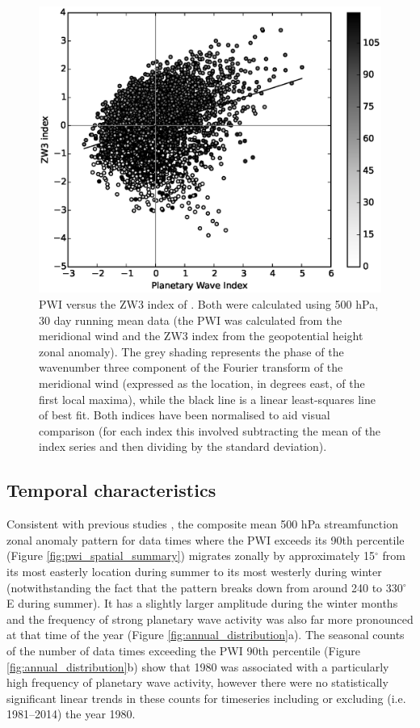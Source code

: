 \begin{figure}
\begin{center}
\includegraphics[width=0.7\columnwidth]{figures/zonalwaves/pwi-vs-zw3index_ERAInterim_500hPa_030day-runmean_native.eps}
\caption[PWI versus the ZW3 index of \citet{Raphael2004}]{\label{fig:metric_vs_zw3}
PWI versus the ZW3 index of \citet{Raphael2004}. Both were calculated using 500 hPa, 30 day running mean data (the PWI was calculated from the meridional wind and the ZW3 index from the geopotential height zonal anomaly). The grey shading represents the phase of the wavenumber three component of the Fourier transform of the meridional wind (expressed as the location, in degrees east, of the first local maxima), while the black line is a linear least-squares line of best fit. Both indices have been normalised to aid visual comparison (for each index this involved subtracting the mean of the index series and then dividing by the standard deviation).}
\end{center}
\end{figure}
    
\subsection{Temporal characteristics}

Consistent with previous studies \citep[e.g.][]{vanLoon1984,Mo1985}, the composite mean 500 hPa streamfunction zonal anomaly pattern for data times where the PWI exceeds its 90th percentile (Figure \ref{fig:pwi_spatial_summary}) migrates zonally by approximately 15$^{\circ}$ from its most easterly location during summer to its most westerly during winter (notwithstanding the fact that the pattern breaks down from around 240 to 330$^{\circ}$E during summer). It has a slightly larger amplitude during the winter months and the frequency of strong planetary wave activity was also far more pronounced at that time of the year (Figure \ref{fig:annual_distribution}a). The seasonal counts of the number of data times exceeding the PWI 90th percentile (Figure \ref{fig:annual_distribution}b) show that 1980 was associated with a particularly high frequency of planetary wave activity, however there were no statistically significant linear trends in these counts for timeseries including or excluding (i.e. 1981--2014) the year 1980.  

